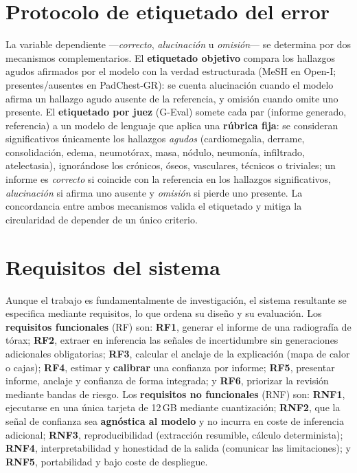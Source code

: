 \section{Protocolo de etiquetado del error}
La variable dependiente —\emph{correcto}, \emph{alucinación} u \emph{omisión}— se determina por dos
mecanismos complementarios. El \textbf{etiquetado objetivo} compara los hallazgos agudos afirmados por
el modelo con la verdad estructurada (MeSH en Open-I; presentes/ausentes en PadChest-GR): se cuenta
alucinación cuando el modelo afirma un hallazgo agudo ausente de la referencia, y omisión cuando
omite uno presente. El \textbf{etiquetado por juez} (G-Eval) somete cada par (informe generado,
referencia) a un modelo de lenguaje que aplica una \textbf{rúbrica fija}: se consideran significativos
únicamente los hallazgos \emph{agudos} (cardiomegalia, derrame, consolidación, edema, neumotórax,
masa, nódulo, neumonía, infiltrado, atelectasia), ignorándose los crónicos, óseos, vasculares,
técnicos o triviales; un informe es \emph{correcto} si coincide con la referencia en los hallazgos
significativos, \emph{alucinación} si afirma uno ausente y \emph{omisión} si pierde uno presente. La
concordancia entre ambos mecanismos valida el etiquetado y mitiga la circularidad de depender de un
único criterio.

\section{Requisitos del sistema}
Aunque el trabajo es fundamentalmente de investigación, el sistema resultante se especifica mediante
requisitos, lo que ordena su diseño y su evaluación. Los \textbf{requisitos funcionales} (RF) son:
\textbf{RF1}, generar el informe de una radiografía de tórax; \textbf{RF2}, extraer en inferencia
las señales de incertidumbre sin generaciones adicionales obligatorias; \textbf{RF3}, calcular el
anclaje de la explicación (mapa de calor o cajas); \textbf{RF4}, estimar y \textbf{calibrar} una
confianza por informe; \textbf{RF5}, presentar informe, anclaje y confianza de forma integrada; y
\textbf{RF6}, priorizar la revisión mediante bandas de riesgo. Los \textbf{requisitos no funcionales}
(RNF) son: \textbf{RNF1}, ejecutarse en una única tarjeta de 12\,GB mediante cuantización;
\textbf{RNF2}, que la señal de confianza sea \textbf{agnóstica al modelo} y no incurra en coste de
inferencia adicional; \textbf{RNF3}, reproducibilidad (extracción resumible, cálculo determinista);
\textbf{RNF4}, interpretabilidad y honestidad de la salida (comunicar las limitaciones); y
\textbf{RNF5}, portabilidad y bajo coste de despliegue.

